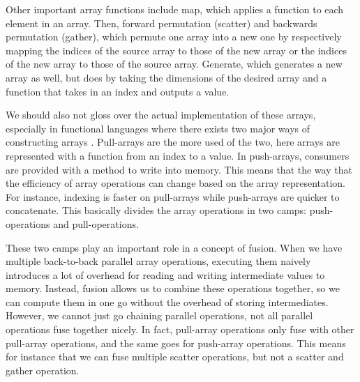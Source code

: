         Other important array functions include map, which applies a function to each element in an array.
        Then, forward permutation (scatter) and backwards permutation (gather), which permute one array into a new one by respectively mapping the indices of the source array to those of the new array or the indices of the new array to those of the source array.
        Generate, which generates a new array as well, but does by taking the dimensions of the desired array and a function that takes in an index and outputs a value.

        We should also not gloss over the actual implementation of these arrays, especially in functional languages where there exists two major ways of constructing arrays \cite{svensson2014defunctionalizing}.
        Pull-arrays are the more used of the two, here arrays are represented with a function from an index to a value.
        In push-arrays, consumers are provided with a method to write into memory.
        This means that the way that the efficiency of array operations can change based on the array representation.
        For instance, indexing is faster on pull-arrays while push-arrays are quicker to concatenate.
        This basically divides the array operations in two camps: push-operations and pull-operations.
        
        These two camps play an important role in a concept of fusion.
        When we have multiple back-to-back parallel array operations, executing them naively introduces a lot of overhead for reading and writing intermediate values to memory.
        Instead, fusion allows us to combine these operations together, so we can compute them in one go without the overhead of storing intermediates.
        However, we cannot just go chaining parallel operations, not all parallel operations fuse together nicely.
        In fact, pull-array operations only fuse with other pull-array operations, and the same goes for push-array operations.
        This means for instance that we can fuse multiple scatter operations, but not a scatter and gather operation.

